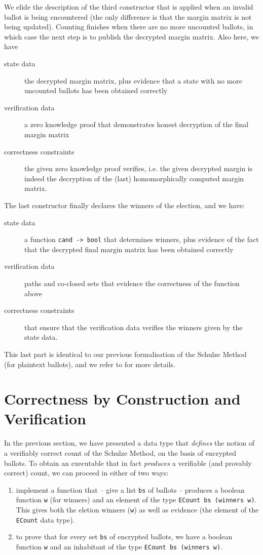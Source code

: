 \documentclass{llncs}
\begin{document}
\noindent
We elide the description of the third constructor that is applied
when an invalid ballot is being encountered (the only
difference is that the margin matrix is not being updated). 
Counting finishes when there are no more uncounted ballots, in
which case the next step is to publish the decrypted margin matrix.
Also here, we have
\begin{description}
  \item[state data] the decrypted margin matrix, plus evidence
  that a state with no more uncounted ballots has been obtained
  correctly
  \item[verification data] a zero knowledge proof that demonstrates
  honest decryption of the final margin matrix
  \item[correctness constraints] the given zero knowledge proof
  verifies, i.e. the given decrypted margin is indeed the decryption
  of the (last) homomorphically computed margin matrix.
\end{description} 

\noindent
The last constructor finally declares the winners of the election,
and we have:
\begin{description}
  \item[state data] a function \texttt{cand -> bool} that determines
  winners, plus evidence of the fact that the decrypted final margin
  matrix has been obtained correctly
  \item[verification data] 
   paths and co-closed sets that evidence the correctness of the
   function above
 \item[correctness constraints] that ensure that the verification
 data verifies the winners given by the state data.
\end{description}
This last part is identical to our previous formalisation of the
Schulze Method (for plaintext ballots), and we refer to 
\cite{Pattinson:2017:SVE} for more details.


\section{Correctness by Construction and Verification}
\label{sec:correct}

In the previous section, we have presented a data type that
\emph{defines} the notion of a verifiably correct count of the
Schulze Method, on the basis of encrypted ballots. To obtain an
executable that in fact \emph{produces} a verifiable (and provably
correct) count, we can proceed in either of two ways:
\begin{enumerate}
  \item implement a function that -- give a list \texttt{bs} of
  ballots -- produces a boolean function \texttt{w} (for winners) and an
  element of the type \texttt{ECount bs (winners w)}. This gives
  both the eletion winners (\texttt{w}) as well as evidence (the
  element of the \texttt{ECount} data type).
  \item to prove that for every set \texttt{bs} of encrypted
  ballots, we have a boolean function \texttt{w} and an inhabitant
  of the type \texttt{ECount bs (winners w)}.
\end{enumerate}
\end{document}
